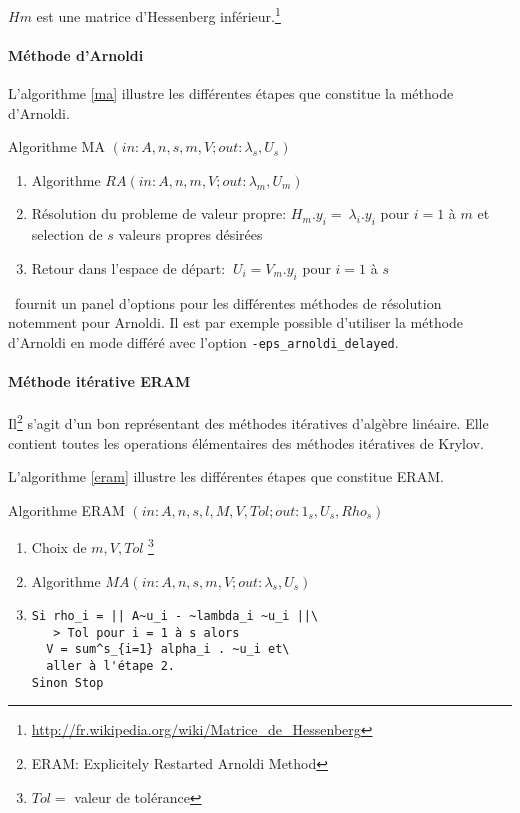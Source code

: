 $Hm$ est une matrice d'Hessenberg inférieur.\footnote{\url{http://fr.wikipedia.org/wiki/Matrice_de_Hessenberg}}

\paragraph{Méthode d'Arnoldi}

L'algorithme \ref{ma} illustre les différentes étapes que constitue la méthode d'Arnoldi.

\begin{algorithm}[h]
  \caption{Algorithme MA $(in:A,n,s,m,V;out:\lambda_s,U_s)$}
  \label{ma}
  \begin{enumerate}
  \item Algorithme $RA(in:A,n,m,V;out:\lambda_m,U_m)$
  \item Résolution du probleme de valeur propre: $H_m.y_i = ~\lambda_i.y_i$ pour $i = 1$ à $m$ et selection de $s$ valeurs propres désirées
  \item Retour dans l'espace de départ: $~U_i = V_m.y_i$ pour $i = 1$ à $s$
  \end{enumerate}
\end{algorithm}

\slepc\ fournit un panel d'options pour les différentes méthodes de résolution notemment pour Arnoldi. Il est par exemple possible d'utiliser la méthode d'Arnoldi en mode différé avec l'option \verb#-eps_arnoldi_delayed#.

\paragraph{Méthode itérative ERAM}

Il\footnote{ERAM: Explicitely Restarted Arnoldi Method} s'agit d'un bon représentant des méthodes itératives d'algèbre linéaire. Elle contient toutes les operations élémentaires des méthodes itératives de Krylov.

L'algorithme \ref{eram} illustre les différentes étapes que constitue ERAM.

\begin{algorithm}[h]
  \caption{Algorithme ERAM $(in:A,n,s,l,M,V,Tol;out: 1_s, U_s, Rho_s)$}
  \label{eram}
  \begin{enumerate}
  \item Choix de $m,V,Tol$ \footnote{$Tol =$ valeur de tolérance}
  \item \label{eram_step2} Algorithme $MA(in: A,n,s,m,V;out:\lambda_s,U_s)$
  \item
\begin{verbatim}
Si rho_i = || A~u_i - ~lambda_i ~u_i ||\
   > Tol pour i = 1 à s alors
  V = sum^s_{i=1} alpha_i . ~u_i et\
  aller à l'étape 2.
Sinon Stop
\end{verbatim}
  \end{enumerate}
\end{algorithm}

